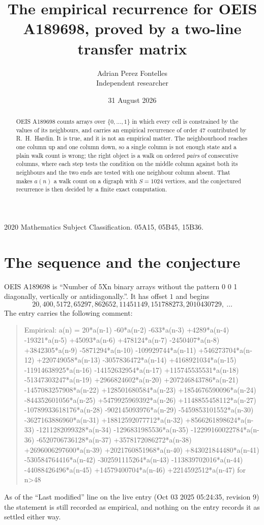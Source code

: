 \documentclass[11pt,a4paper]{article}
\title{The empirical recurrence for OEIS A189698, proved by a two-line transfer matrix}
\author{Adrian Perez Fontelles\\ \small Independent researcher}
\date{31 August 2026}
\theoremstyle{plain}
\theoremstyle{definition}
\begin{document}
\maketitle

\begin{abstract}
OEIS A189698 counts arrays over $\{0,\dots,1\}$ in which every cell is constrained by the
values of its neighbours, and carries an empirical recurrence of order $47$ contributed
by R.~H.~Hardin. It is true, and it is not an empirical matter. The neighbourhood reaches one
column up and one column down, so a single column is not enough state and a plain walk count
is wrong; the right object is a walk on ordered \emph{pairs} of consecutive columns, where
each step tests the condition on the middle column against both its neighbours and the two
ends are tested with one neighbour column absent. That makes $a(n)$ a walk count on a digraph
with $S=1024$ vertices, and the conjectured recurrence is then decided by a finite exact
computation.
\end{abstract}

\noindent\small 2020 Mathematics Subject Classification. 05A15, 05B45, 15B36.\normalsize

\section{The sequence and the conjecture}

OEIS A189698 is ``Number of 5Xn binary arrays without the pattern 0 0 1 diagonally, vertically or antidiagonally.''. It has offset $1$ and begins
\[
20, 400, 5172, 65297, 862652, 11451149, 151788273, 2010430729,\ \dots
\]
The entry carries the following comment:
\begin{quote}\small
Empirical: a(n) = 20*a(n-1) -60*a(n-2) -633*a(n-3) +4289*a(n-4) -19321*a(n-5) +45093*a(n-6) +478124*a(n-7) -2450407*a(n-8) +3842305*a(n-9) -5871294*a(n-10) -109929744*a(n-11) +546273704*a(n-12) +220749058*a(n-13) -3057836472*a(n-14) +4168921034*a(n-15) -11914638925*a(n-16) -14152632954*a(n-17) +115745535531*a(n-18) -51347303247*a(n-19) +2966824602*a(n-20) +207246843786*a(n-21) -1457083257908*a(n-22) +128501680584*a(n-23) +1854676590096*a(n-24) -844352601056*a(n-25) +5479925969392*a(n-26) +1148855458112*a(n-27) -10789933618176*a(n-28) -902145093976*a(n-29) -5459853101552*a(n-30) -3627163886960*a(n-31) +18812592077712*a(n-32) +8566261898624*a(n-33) -1211282099328*a(n-34) -1296831985536*a(n-35) -12299160022784*a(n-36) -6520706736128*a(n-37) +3578172086272*a(n-38) +2696006297600*a(n-39) +2021760851968*a(n-40) +843021844480*a(n-41) -530584764416*a(n-42) -302591115264*a(n-43) -113839702016*a(n-44) -44088426496*a(n-45) +14579400704*a(n-46) +2214592512*a(n-47) for n>48
\end{quote}
As of the ``Last modified'' line on the live entry (Oct 03 2025 05:24:35, revision 9) the statement is
still recorded as empirical, and nothing on the entry records it as settled either way.
\end{document}
